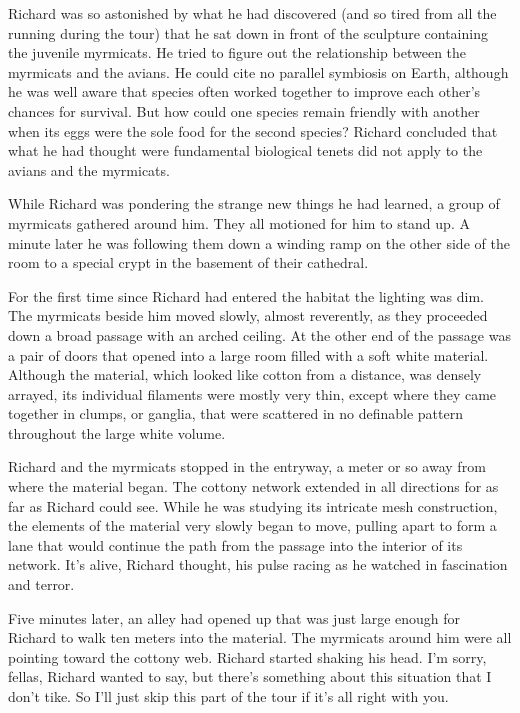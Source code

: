 \documentclass[]{article}
\begin{document}
{{Richard was so astonished by what he had discovered (and so tired from all the running during the tour) that he sat down in front of the sculpture containing the juvenile myrmicats. He tried to figure out the relationship between the myrmicats and the avians. He could cite no parallel symbiosis on Earth, although he was well aware that species often worked together to improve each other’s chances for survival. But how could one species remain friendly with another when its eggs were the sole food for the second species? Richard concluded that what he had thought were fundamental biological tenets did not apply to the avians and the myrmicats.

While Richard was pondering the strange new things he had learned, a group of myrmicats gathered around him. They all motioned for him to stand up. A minute later he was following them down a winding ramp on the other side of the room to a special crypt in the basement of their cathedral.

For the first time since Richard had entered the habitat the lighting was dim. The myrmicats beside him moved slowly, almost reverently, as they proceeded down a broad passage with an arched ceiling. At the other end of the passage was a pair of doors that opened into a large room filled with a soft white material. Although the material, which looked like cotton from a distance, was densely arrayed, its individual filaments were mostly very thin, except where they came together in clumps, or ganglia, that were scattered in no definable pattern throughout the large white volume.

Richard and the myrmicats stopped in the entryway, a meter or so away from where the material began. The cottony network extended in all directions for as far as Richard could see. While he was studying its intricate mesh construction, the elements of the material very slowly began to move, pulling apart to form a lane that would continue the path from the passage into the interior of its network. It’s alive, Richard thought, his pulse racing as he watched in fascination and terror.

Five minutes later, an alley had opened up that was just large enough for Richard to walk ten meters into the material. The myrmicats around him were all pointing toward the cottony web. Richard started shaking his head. I’m sorry, fellas, Richard wanted to say, but there’s something about this situation that I don’t tike. So I’ll just skip this part of the tour if it’s all right with you.

}}
\end{document}
